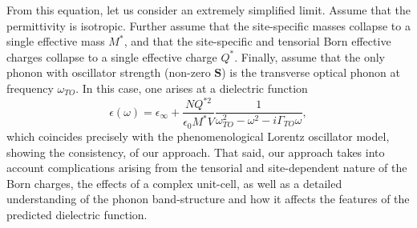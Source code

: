 \documentclass[superscriptaddress,reprint,prb]{revtex4-1}
\begin{document}
From this equation, let us consider an extremely simplified limit. Assume that the permittivity is isotropic. Further assume that the site-specific masses collapse to a single effective mass $M^*$, and that the site-specific and tensorial Born effective charges collapse to a single effective charge $Q^*$. Finally, assume that the only phonon with oscillator strength (non-zero $\mathbf{S}$) is the transverse optical phonon at frequency $\omega_{TO}$. In this case, one arises at a dielectric function 
\begin{equation}
\epsilon(\omega) = \epsilon_{\infty} + \frac{NQ^{*2}}{\epsilon_0 M^*V}\frac{1}{\omega^2_{TO}-\omega^2-i\Gamma_{TO}\omega},
\end{equation}
which coincides precisely with the phenomenological Lorentz oscillator model, showing the consistency, of our approach. That said, our approach takes into account complications arising from the tensorial and site-dependent nature of the Born charges, the effects of a complex unit-cell, as well as a detailed understanding of the phonon band-structure and how it affects the features of the predicted dielectric function.
\end{document}
